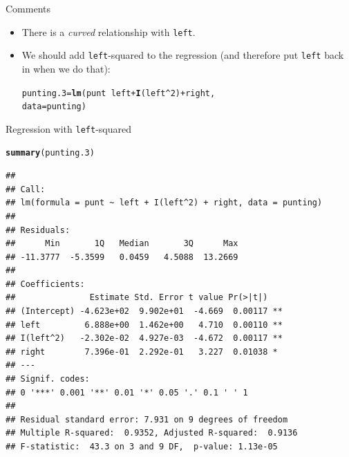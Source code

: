 \documentclass[unknownkeysallowed]{beamer}\usepackage[]{graphicx}\usepackage[]{color}
\makeatletter
\newcommand{\hlnum}[1]{\textcolor[rgb]{0.686,0.059,0.569}{#1}}%
\newcommand{\hlopt}[1]{\textcolor[rgb]{0,0,0}{#1}}%
\newcommand{\hlstd}[1]{\textcolor[rgb]{0.345,0.345,0.345}{#1}}%
\newcommand{\hlkwb}[1]{\textcolor[rgb]{0.69,0.353,0.396}{#1}}%
\newcommand{\hlkwc}[1]{\textcolor[rgb]{0.333,0.667,0.333}{#1}}%
\newcommand{\hlkwd}[1]{\textcolor[rgb]{0.737,0.353,0.396}{\textbf{#1}}}%
\newenvironment{kframe}{%
 \def\at@end@of@kframe{}%
 \ifinner\ifhmode%
  \def\at@end@of@kframe{\end{minipage}}%
  \begin{minipage}{\columnwidth}%
 \fi\fi%
 \def\FrameCommand##1{\hskip\@totalleftmargin \hskip-\fboxsep
 \colorbox{shadecolor}{##1}\hskip-\fboxsep
     \hskip-\linewidth \hskip-\@totalleftmargin \hskip\columnwidth}%
 \MakeFramed {\advance\hsize-\width
   \@totalleftmargin\z@ \linewidth\hsize
   \@setminipage}}%
 {\par\unskip\endMakeFramed%
 \at@end@of@kframe}
\newenvironment{knitrout}{}{} %
\makeatother
\begin{document}
\begin{frame}[fragile]{Comments}
  
  \begin{itemize}
  \item There is a \emph{curved} relationship with \texttt{left}.
  \item We should add \texttt{left}-squared to the regression (and
    therefore put \texttt{left} back in when we do that):
    
\begin{knitrout}
\color{fgcolor}\begin{kframe}
\begin{alltt}
\hlstd{punting.3}\hlkwb{=}\hlkwd{lm}\hlstd{(punt}\hlopt{~}\hlstd{left}\hlopt{+}\hlkwd{I}\hlstd{(left}\hlopt{^}\hlnum{2}\hlstd{)}\hlopt{+}\hlstd{right,}
  \hlkwc{data}\hlstd{=punting)}
\end{alltt}
\end{kframe}
\end{knitrout}
  \end{itemize}
  
\end{frame}

\begin{frame}[fragile]{Regression with \texttt{left}-squared}
  
\begin{knitrout}\scriptsize
{}\color{fgcolor}\begin{kframe}
\begin{alltt}
\hlkwd{summary}\hlstd{(punting.3)}
\end{alltt}
\begin{verbatim}
## 
## Call:
## lm(formula = punt ~ left + I(left^2) + right, data = punting)
## 
## Residuals:
##      Min       1Q   Median       3Q      Max 
## -11.3777  -5.3599   0.0459   4.5088  13.2669 
## 
## Coefficients:
##               Estimate Std. Error t value Pr(>|t|)   
## (Intercept) -4.623e+02  9.902e+01  -4.669  0.00117 **
## left         6.888e+00  1.462e+00   4.710  0.00110 **
## I(left^2)   -2.302e-02  4.927e-03  -4.672  0.00117 **
## right        7.396e-01  2.292e-01   3.227  0.01038 * 
## ---
## Signif. codes:  
## 0 '***' 0.001 '**' 0.01 '*' 0.05 '.' 0.1 ' ' 1
## 
## Residual standard error: 7.931 on 9 degrees of freedom
## Multiple R-squared:  0.9352,	Adjusted R-squared:  0.9136 
## F-statistic:  43.3 on 3 and 9 DF,  p-value: 1.13e-05
\end{verbatim}
\end{kframe}
\end{knitrout}

  
\end{frame}
\end{document}
